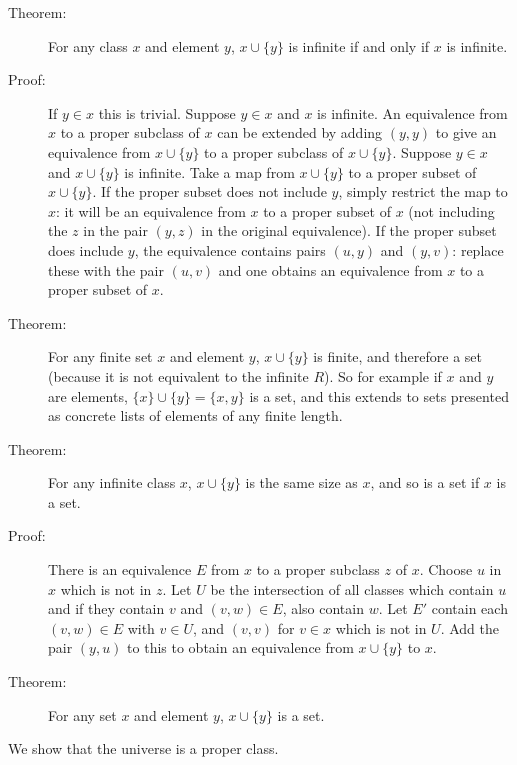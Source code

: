 \documentclass[12pt]{article}
\begin{document}
\begin{description}
\item[Theorem:]  For any class $x$ and element $y$, $x \cup \{y\}$ is infinite if and only if $x$ is infinite.

\item[Proof:]  If $y \in x$ this is trivial.  Suppose $y \in x$ and $x$ is infinite.  An equivalence from $x$ to a proper subclass of $x$ can be extended by adding $(y,y)$ to give an equivalence from $x \cup \{y\}$ to a proper subclass of $x \cup \{y\}$.  Suppose $y \in x$ and $x \cup \{y\}$ is infinite.  Take a map from $x \cup \{y\}$ to a proper subset of $x \cup \{y\}$.  If the proper subset does not include $y$, simply restrict the map to $x$:  it will be an equivalence from $x$ to a proper subset of $x$ (not including the $z$ in the pair $(y,z)$ in the original equivalence).  If the proper subset does include $y$, the equivalence contains pairs $(u,y)$ and $(y,v)$:  replace these with the pair $(u,v)$ and one obtains an equivalence from
$x$ to a proper subset of $x$.

\item[Theorem:]  For any finite set $x$ and element $y$, $x \cup \{y\}$ is finite, and therefore a set (because it is not equivalent to the infinite $R$).  So for example if $x$ and $y$ are elements, $\{x\} \cup \{y\} = \{x,y\}$ is a set,
and this extends to sets presented as concrete lists of elements of any finite length.

\item[Theorem:]  For any infinite class $x$, $x \cup \{y\}$ is the same size as $x$, and so is a set if $x$ is a set.

\item[Proof:]  There is an equivalence $E$ from $x$ to a proper subclass $z$ of $x$.  Choose $u$  in $x$ which is not in $z$.  Let $U$ be the intersection of all classes which contain $u$ and if they contain $v$ and $(v,w) \in E$, also contain $w$.  Let $E'$ contain each $(v,w)\in E$ with $v \in U$, and $(v,v)$ for $v \in x$ which is not in $U$.  Add the pair $(y,u)$ to this to obtain an equivalence from $x \cup \{y\}$ to $x$.

\item[Theorem:]  For any set $x$ and element $y$, $x \cup \{y\}$ is a set.

\end{description}

We show that the universe is a proper class.
\end{document}
